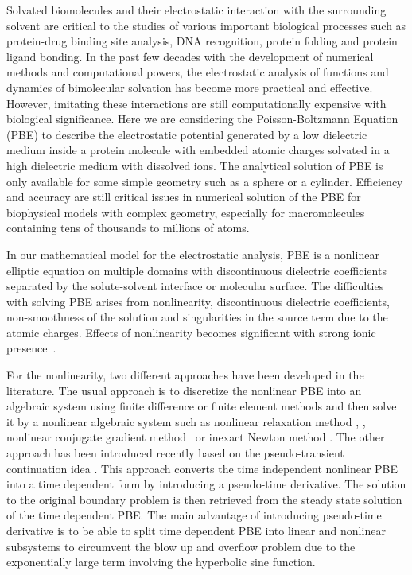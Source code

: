 Solvated biomolecules and their electrostatic interaction with the surrounding solvent are critical to the studies of various important biological processes such as protein-drug binding site analysis, DNA recognition, protein folding and protein ligand bonding. In the past few decades with the development of numerical methods and computational powers, the electrostatic analysis of functions and dynamics of bimolecular solvation has become more practical and effective. However, imitating these interactions are still computationally expensive with biological significance. Here we are considering the Poisson-Boltzmann Equation (PBE)  to describe the electrostatic potential generated by a low dielectric medium inside a protein molecule with embedded atomic charges solvated in a high dielectric medium with dissolved ions. The analytical solution of PBE is only available for some simple geometry such as a sphere or a cylinder. Efficiency and accuracy are still critical issues in numerical solution of the PBE for biophysical models with complex geometry, especially for macromolecules  containing tens of thousands to millions of atoms. 

 In our mathematical model for the electrostatic analysis, PBE is a nonlinear elliptic equation on multiple domains with discontinuous dielectric coefficients separated  by the solute-solvent interface or molecular surface. The difficulties with solving PBE arises from nonlinearity, discontinuous dielectric coefficients, non-smoothness of the solution and singularities in the source term due to the atomic charges. Effects of nonlinearity becomes significant with strong ionic presence~\cite{Wilson2016}. 


For the nonlinearity, two different approaches have been developed in the literature. The usual approach is to discretize the nonlinear PBE into an algebraic system using finite difference or finite element methods and then solve it by a nonlinear algebraic system such as nonlinear relaxation method \cite{Im1998}, \cite{Rocchia2001}, nonlinear conjugate gradient method~\cite{Luty1992} or inexact Newton method \cite{Holst1995}. The other approach has been introduced recently based on the  pseudo-transient continuation idea \cite{Shestakov2002,Sayyed-Ahmad2004,Zhao2011}. This approach converts the time independent nonlinear PBE into a time dependent form by introducing a pseudo-time derivative. The solution to the original boundary problem is then retrieved from the steady state solution of the time dependent PBE. The main advantage of introducing pseudo-time derivative is to be able to split time dependent PBE into linear and nonlinear subsystems to circumvent the blow up and overflow problem due to the exponentially large term involving the hyperbolic sine function. 

